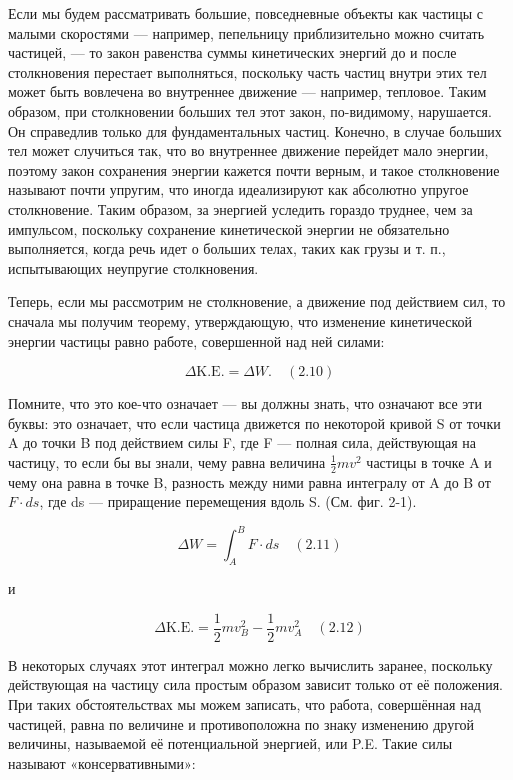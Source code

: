 \documentclass[10pt,oneside]{article}
\newcommand{\TipsSubsection}[1]{\par\vspace{6bp}{\normalsize\bfseries #1\par}\vspace{2bp}}
\begin{document}
Если мы будем рассматривать большие, повседневные объекты как частицы с малыми скоростями --- например, пепельницу приблизительно можно считать частицей, --- то закон равенства суммы кинетических энергий до и после столкновения перестает выполняться, поскольку часть частиц внутри этих тел может быть вовлечена во внутреннее движение --- например, тепловое. Таким образом, при столкновении больших тел этот закон, по-видимому, нарушается. Он справедлив только для фундаментальных частиц. Конечно, в случае больших тел может случиться так, что во внутреннее движение перейдет мало энергии, поэтому закон сохранения энергии кажется почти верным, и такое столкновение называют почти упругим, что иногда идеализируют как абсолютно упругое столкновение. Таким образом, за энергией уследить гораздо труднее, чем за импульсом, поскольку сохранение кинетической энергии не обязательно выполняется, когда речь идет о больших телах, таких как грузы и т. п., испытывающих неупругие столкновения.\par

\TipsSubsection{2-3 Движение под действием сил}

Теперь, если мы рассмотрим не столкновение, а движение под действием сил, то сначала мы получим теорему, утверждающую, что изменение кинетической энергии частицы равно работе, совершенной над ней силами:\par

\[\Delta \text{K.E.} = \Delta W. \quad(2.10)\]\par

Помните, что это кое-что означает --- вы должны знать, что означают все эти буквы: это означает, что если частица движется по некоторой кривой S от точки A до точки B под действием силы F, где F --- полная сила, действующая на частицу, то если бы вы знали, чему равна величина \(\frac{1}{2}mv^2\) частицы в точке A и чему она равна в точке B, разность между ними равна интегралу от A до B от \(F \cdot ds\), где ds --- приращение перемещения вдоль S. (См. фиг. 2-1).\par

\[\Delta W = \int_A^B F \cdot ds \quad(2.11)\]\par

и\par

\[\Delta \text{K.E.} = \frac{1}{2}mv_B^2 - \frac{1}{2}mv_A^2 \quad(2.12)\]\par

В некоторых случаях этот интеграл можно легко вычислить заранее, поскольку действующая на частицу сила простым образом зависит только от её положения. При таких обстоятельствах мы можем записать, что работа, совершённая над частицей, равна по величине и противоположна по знаку изменению другой величины, называемой её потенциальной энергией, или P.E. Такие силы называют «консервативными»:\par
\end{document}
